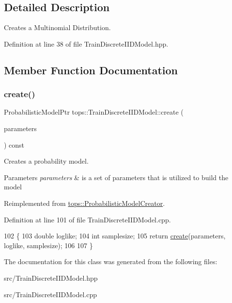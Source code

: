 \subsection{Detailed Description}
Creates a Multinomial Distribution. 

Definition at line 38 of file Train\+Discrete\+I\+I\+D\+Model.\+hpp.



\subsection{Member Function Documentation}
\mbox{\label{classtops_1_1TrainDiscreteIIDModel_a072a44dfaeb57cdffea9988f7a053bb8}} 
\subsubsection{\texorpdfstring{create()}{create()}}
{\footnotesize\ttfamily Probabilistic\+Model\+Ptr tops\+::\+Train\+Discrete\+I\+I\+D\+Model\+::create (\begin{DoxyParamCaption}\item[{\hyperlink{classtops_1_1ProbabilisticModelParameters}{Probabilistic\+Model\+Parameters} \&}]{parameters }\end{DoxyParamCaption}) const\hspace{0.3cm}{\ttfamily [virtual]}}



Creates a probability model. 


\begin{DoxyParams}{Parameters}
{\em parameters} & is a set of parameters that is utilized to build the model \\
\hline
\end{DoxyParams}


Reimplemented from \hyperlink{classtops_1_1ProbabilisticModelCreator_afed6c8ffa45fff446bdaa8b533da8f7c}{tops\+::\+Probabilistic\+Model\+Creator}.



Definition at line 101 of file Train\+Discrete\+I\+I\+D\+Model.\+cpp.


\begin{DoxyCode}
102                                                                                                            
            \{
103     \textcolor{keywordtype}{double} loglike;
104     \textcolor{keywordtype}{int} samplesize;
105     \textcolor{keywordflow}{return} \hyperlink{classtops_1_1TrainDiscreteIIDModel_a072a44dfaeb57cdffea9988f7a053bb8}{create}(parameters, loglike, samplesize);
106 
107   \}
\end{DoxyCode}


The documentation for this class was generated from the following files\+:\begin{DoxyCompactItemize}
\item 
src/Train\+Discrete\+I\+I\+D\+Model.\+hpp\item 
src/Train\+Discrete\+I\+I\+D\+Model.\+cpp\end{DoxyCompactItemize}
